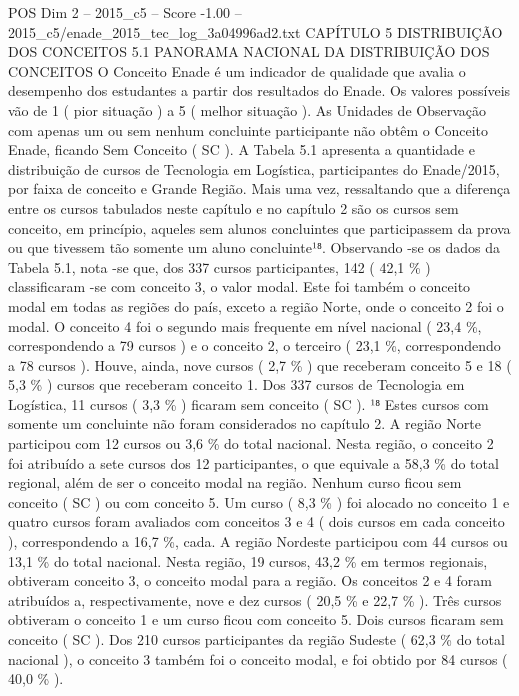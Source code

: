 \begin{textsample}{POS Dim 2 – 2015\_c5 – Score -1.00 – 2015\_c5/enade\_2015\_tec\_log\_3a04996ad2.txt}  \label{ex:f2_pos_275}
CAPÍTULO 5 DISTRIBUIÇÃO DOS CONCEITOS 5.1 PANORAMA NACIONAL DA DISTRIBUIÇÃO DOS CONCEITOS O Conceito Enade é um indicador de qualidade que avalia o desempenho dos estudantes a partir dos resultados do Enade.
Os valores possíveis vão de 1 ( pior situação ) a 5 ( melhor situação ).
As Unidades de Observação com apenas um ou sem nenhum concluinte participante não obtêm o Conceito Enade, ficando Sem Conceito ( SC ).
A Tabela 5.1 apresenta a quantidade e distribuição de cursos de Tecnologia em Logística, participantes do Enade/2015, por faixa de conceito e Grande Região.
Mais uma vez, ressaltando que a diferença entre os cursos tabulados neste capítulo e no capítulo 2 são os cursos sem conceito, em princípio, aqueles sem alunos concluintes que participassem da prova ou que tivessem tão somente um aluno concluinte¹⁸.
Observando -se os dados da Tabela 5.1, nota -se que, dos 337 cursos participantes, 142 ( 42,1 \% ) classificaram -se com conceito 3, o valor modal.
Este foi também o conceito modal em todas as regiões do país, exceto a região Norte, onde o conceito 2 foi o modal.
O conceito 4 foi o segundo mais frequente em nível nacional ( 23,4 \%, correspondendo a 79 cursos ) e o conceito 2, o terceiro ( 23,1 \%, correspondendo a 78 cursos ).
Houve, ainda, nove cursos ( 2,7 \% ) que receberam conceito 5 e 18 ( 5,3 \% ) cursos que receberam conceito 1.
Dos 337 cursos de Tecnologia em Logística, 11 cursos ( 3,3 \% ) ficaram sem conceito ( SC ). ¹⁸ Estes cursos com somente um concluinte não foram considerados no capítulo 2.
A região Norte participou com 12 cursos ou 3,6 \% do total nacional.
Nesta região, o conceito 2 foi atribuído a sete cursos dos 12 participantes, o que equivale a 58,3 \% do total regional, além de ser o conceito modal na região.
Nenhum curso ficou sem conceito ( SC ) ou com conceito 5.
Um curso ( 8,3 \% ) foi alocado no conceito 1 e quatro cursos foram avaliados com conceitos 3 e 4 ( dois cursos em cada conceito ), correspondendo a 16,7 \%, cada.
A região Nordeste participou com 44 cursos ou 13,1 \% do total nacional.
Nesta região, 19 cursos, 43,2 \% em termos regionais, obtiveram conceito 3, o conceito modal para a região.
Os conceitos 2 e 4 foram atribuídos a, respectivamente, nove e dez cursos ( 20,5 \% e 22,7 \% ).
Três cursos obtiveram o conceito 1 e um curso ficou com conceito 5.
Dois cursos ficaram sem conceito ( SC ).
Dos 210 cursos participantes da região Sudeste ( 62,3 \% do total nacional ), o conceito 3 também foi o conceito modal, e foi obtido por 84 cursos ( 40,0 \% ).

\end{textsample}
